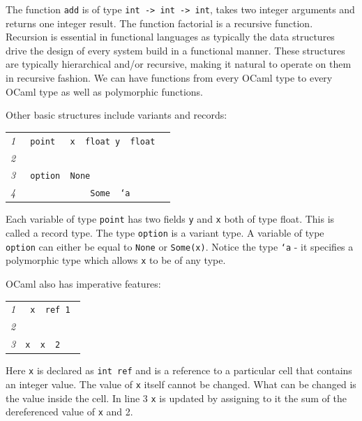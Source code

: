 \documentclass[12pt,twoside,notitlepage]{report}
\newcommand{\mlkeywordA}[1]{\mbox{\color{cyan}{\textbf{\texttt{#1}}}}}
\newcommand{\mlkeyword}[1]{\mbox{\color{red}{#1}}}
\newcommand{\mloperator}[1]{\mbox{\color{darkgreen}{#1}}}
\newcommand{\mlcodeline}[2]{\tiny\sl #1 & \begin{minipage}[c]{0.8\linewidth}\begin{alltt}\mbox{#2}\end{alltt}\end{minipage}\\}
\begin{document}
The function {\tt add} is of type {\tt int -> int -> int}, takes two integer arguments and returns one integer result. The function factorial is a recursive function. Recursion is essential in functional languages as typically the data structures drive the design of every system build in a functional manner. These structures are typically hierarchical and/or recursive, making it natural to operate on them in recursive fashion. We can have functions from every OCaml type to every OCaml type as well as polymorphic functions.

Other basic structures include variants and records:



{\scriptsize\noindent\begin{longtable}{r|l}
\mlcodeline{1}{\mlkeyword{type}~point~\mlkeyword{=}~\mloperator{\{}~x~\mloperator{\mbox{\COLON}}~float\mloperator{\mbox{\SC}}~y~\mloperator{\mbox{\COLON}}~float~\mloperator{\}}
}
\mlcodeline{2}{
}
\mlcodeline{3}{\mlkeyword{type}~option~\mlkeyword{=}~None
}
\mlcodeline{4}{~~~~~~~~~~~~~\mloperator{|}Some~\mlkeyword{of}~`a
}
\end{longtable}
}
Each variable of type {\tt point} has two fields {\tt y} and {\tt x} both of type float. This is called a record type. The type {\tt option} is a variant type. A variable of type {\tt option} can either be equal to {\tt None} or {\tt Some(x)}. Notice the type {\tt `a} - it specifies a polymorphic type which allows {\tt x} to be of any type.

OCaml also has imperative features:



{\scriptsize\noindent\begin{longtable}{r|l}
\mlcodeline{1}{\mlkeywordA{let}~x~\mlkeyword{=}~ref~1
}
\mlcodeline{2}{
}
\mlcodeline{3}{x~\mloperator{\mbox{\COLON}{}=}~\mloperator{\mbox{}\hspace{0pt}{!}\hspace{0pt}}x~\mloperator{+}~2~
}
\end{longtable}
}

Here {\tt x} is declared as {\tt int ref} and is a reference to a particular cell that contains an integer value. The value of {\tt x} itself cannot be changed. What can be changed is the value inside the cell. In line 3 {\tt x} is updated by assigning to it the sum of the dereferenced value of {\tt x} and 2.  
\end{document}
